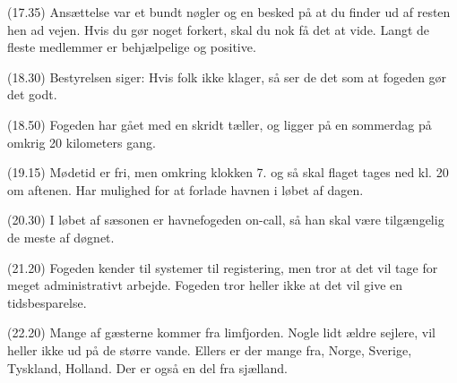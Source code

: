 \documentclass{article}
\begin{document}
(17.35) Ansættelse var et bundt nøgler og en besked på at du finder ud af resten hen ad vejen. Hvis du gør noget forkert, skal du nok få det at vide. Langt de fleste medlemmer er behjælpelige og positive.

(18.30) Bestyrelsen siger: Hvis folk ikke klager, så ser de det som at fogeden gør det godt.

(18.50) Fogeden har gået med en skridt tæller, og ligger på en sommerdag på omkrig 20 kilometers gang.

(19.15) Mødetid er fri, men omkring klokken 7. og så skal flaget tages ned kl. 20 om aftenen. Har mulighed for at forlade havnen i løbet af dagen.

(20.30) I løbet af sæsonen er havnefogeden on-call, så han skal være tilgængelig de meste af døgnet.

(21.20) Fogeden kender til systemer til registering, men tror at det vil tage for meget administrativt arbejde. Fogeden tror heller ikke at det vil give en tidsbesparelse.

(22.20) Mange af gæsterne kommer fra limfjorden. Nogle lidt ældre sejlere, vil heller ikke ud på de større vande. Ellers er der mange fra, Norge, Sverige, Tyskland, Holland. Der er også en del fra sjælland.
\end{document}

